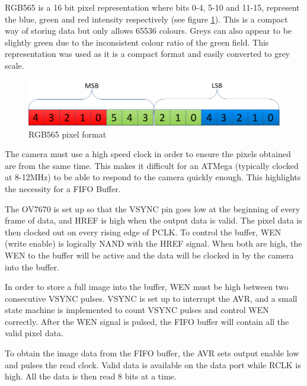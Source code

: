 RGB565 is a 16 bit pixel representation where bits 0-4, 5-10 and 11-15, represent the blue, green and red intensity respectively (see figure \ref{fig:RGB565}). This is a compact way of storing data but only allows 65536 colours. Greys can also appear to be slightly green due to the inconsistent colour ratio of the green field. This representation was used as it is a compact format and easily converted to grey scale.
\begin{figure}
\includegraphics[width = \textwidth]{./Figures/RGB565.png}
\caption{RGB565 pixel format}
\label{fig:RGB565}
\end{figure}

The camera must use a high speed clock in order to ensure the pixels obtained are from the same time. This makes it difficult for an ATMega (typically clocked at 8-12MHz) to be able to respond to the camera quickly enough. This highlights the necessity for a FIFO Buffer. 

The OV7670 is set up so that the VSYNC pin goes low at the beginning of every frame of data, and HREF is high when the output data is valid. The pixel data is then clocked out on every rising edge of PCLK. To control the buffer, WEN (write enable) is logically NAND with the HREF signal. When both are high, the WEN to the buffer will be active and the data will be clocked in by the camera into the buffer. 

In order to store a full image into the buffer, WEN must be high between two consecutive VSYNC pulses. VSYNC is set up to interrupt the AVR, and a small state machine is implemented to count VSYNC pulses and control WEN correctly. After the WEN signal is pulsed, the FIFO buffer will contain all the valid pixel data.

To obtain the image data from the FIFO buffer, the AVR sets output enable low and pulses the read clock. Valid data is available on the data port while RCLK is high. All the data is then read 8 bits at a time.

